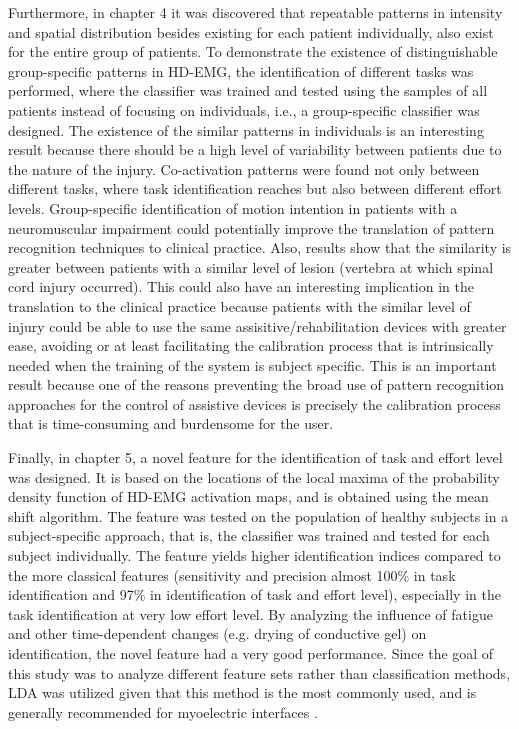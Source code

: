 Furthermore, in chapter 4 it was discovered that repeatable patterns in intensity and spatial distribution besides existing for each patient individually, also exist for the entire group of patients. To demonstrate the existence of distinguishable group-specific patterns in HD-EMG, the identification of different tasks was performed, where the classifier was trained and tested using the samples of all patients instead of focusing on individuals, i.e., a group-specific classifier was designed. The existence of the similar patterns in individuals is an interesting result because there should be a high level of variability between patients due to the nature of the injury. Co-activation patterns were found not only between different tasks, where task identification reaches but also between different effort levels. Group-specific identification of motion intention in patients with a neuromuscular impairment could potentially improve the translation of pattern recognition techniques to clinical practice. Also, results show that the similarity is greater between patients with a similar level of lesion (vertebra at which spinal cord injury occurred). This could also have an interesting implication in the translation to the clinical practice because patients with the similar level of injury could be able to use the same assisitive/rehabilitation devices with greater ease, avoiding or at least facilitating the calibration process that is intrinsically needed when the training of the system is subject specific. This is an important result because one of the reasons preventing the broad use of pattern recognition approaches for the control of assistive devices is precisely the calibration process that is time-consuming and burdensome for the user.

Finally, in chapter 5, a novel feature for the identification of task and effort level was designed. It is based on the locations of the local maxima of the probability density function of HD-EMG activation maps, and is obtained using the mean shift algorithm. The feature was tested on the population of healthy subjects in a subject-specific approach, that is, the classifier was trained and tested for each subject individually. The feature yields higher identification indices compared to the more classical features (sensitivity and precision almost 100\% in task identification and 97\% in identification of task and effort level), especially in the task identification at very low effort level. By analyzing the influence of fatigue and other time-dependent changes (e.g. drying of conductive gel) on identification, the novel feature had a very good performance. Since the goal of this study was to analyze different feature sets rather than classification methods, LDA was utilized given that this method is the most commonly used, and is generally recommended for myoelectric interfaces \citep{Hakonen2015}.

